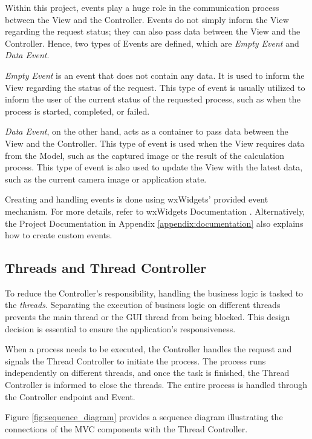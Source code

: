 Within this project, events play a huge role in the communication process between the View and the Controller. Events do not simply inform the View regarding the request status; they can also pass data between the View and the Controller. Hence, two types of Events are defined, which are \textit{Empty Event} and \textit{Data Event}.

\textit{Empty Event} is an event that does not contain any data. It is used to inform the View regarding the status of the request. This type of event is usually utilized to inform the user of the current status of the requested process, such as when the process is started, completed, or failed.

\textit{Data Event}, on the other hand, acts as a container to pass data between the View and the Controller. This type of event is used when the View requires data from the Model, such as the captured image or the result of the calculation process. This type of event is also used to update the View with the latest data, such as the current camera image or application state.

Creating and handling events is done using wxWidgets' provided event mechanism. For more details, refer to wxWidgets Documentation \cite{wxWidgetsEvent}. Alternatively, the Project Documentation in Appendix \ref{appendix:documentation} also explains how to create custom events.

\subsection{Threads and Thread Controller}
\label{subsec:thread_and_thread_controller}
To reduce the Controller's responsibility, handling the business logic is tasked to the \textit{threads}. Separating the execution of business logic on different threads prevents the main thread or the GUI thread from being blocked. This design decision is essential to ensure the application's responsiveness.

When a process needs to be executed, the Controller handles the request and signals the Thread Controller to initiate the process. The process runs independently on different threads, and once the task is finished, the Thread Controller is informed to close the threads. The entire process is handled through the Controller endpoint and Event.

Figure \ref{fig:sequence_diagram} provides a sequence diagram illustrating the connections of the MVC components with the Thread Controller.

